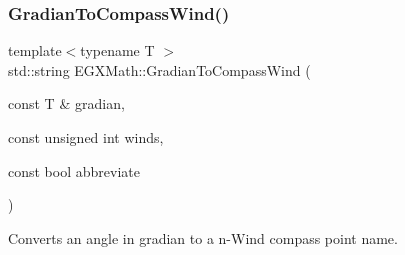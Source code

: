 \mbox{\label{group___e_g_x_math-_angle_conversions-_gradian_ga52ed2e44217e6a57e56829bee36612dc}} 
\subsubsection{\texorpdfstring{Gradian\+To\+Compass\+Wind()}{GradianToCompassWind()}}
{\footnotesize\ttfamily template$<$typename T $>$ \\
std\+::string E\+G\+X\+Math\+::\+Gradian\+To\+Compass\+Wind (\begin{DoxyParamCaption}\item[{const T \&}]{gradian,  }\item[{const unsigned int}]{winds,  }\item[{const bool}]{abbreviate }\end{DoxyParamCaption})}



Converts an angle in gradian to a n-\/\+Wind compass point name. 

